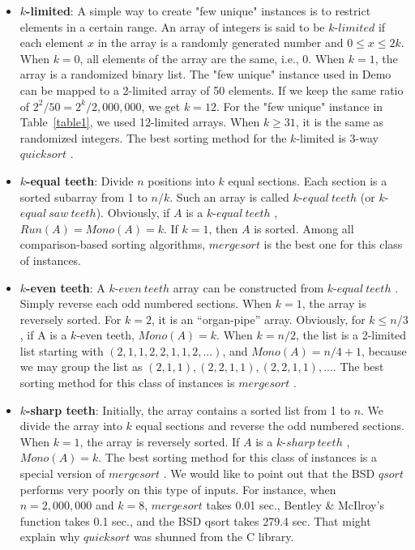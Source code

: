 \documentclass[AMA,STIX1COL]{WileyNJD-v2}
\newcommand{\klit}{$k$-$limited$ }
\newcommand{\keq}{$k$-$equal\ teeth$ }
\newcommand{\kev}{$k$-$even\ teeth$ }
\newcommand{\ksha}{$k$-$sharp\ teeth$ }
\newcommand{\qusort}{$quicksort$ }
\newcommand{\msort}{$mergesort$ }
\begin{document}
\begin{itemize}
\item \textbf{$k$-limited}: A simple way to create "few unique" instances is to restrict elements in a certain range. 
An array of integers is said to be \klit if each element $x$ in the array is a randomly generated number and $0 \leq x \leq 2k$. 
When $k = 0$, all elements of the array are the same, i.e., 0. 
When $k = 1$, the array is a randomized binary list. 
The "few unique" instance used in Demo can be mapped to a 2-limited array of 50 elements.  
If we keep the same ratio of $2^2/50 = 2^k/2,000,000$, we get $k = 12$.  
For the "few unique" instance in Table~\ref{table1}, we used 12-limited arrays.  
When $k \ge 31$, it is the same as randomized integers. 
The best sorting method for the $k$-limited is 3-way \qusort.   

\item \textbf{$k$-equal teeth}: Divide $n$ positions into $k$ equal sections. 
Each section is a sorted subarray from 1 to $n/k$. 
Such an array is called \keq (or $k$-$equal\ saw\ teeth$). 
Obviously, if $A$ is a \keq, $Run(A) = Mono(A) = k$. If $k = 1$, then $A$ is sorted. 
Among all comparison-based sorting algorithms, \msort is the best one for this class of instances. 

\item \textbf{$k$-even teeth}:  A \kev array can be constructed from \keq. 
Simply reverse each odd numbered sections. 
When $k = 1$, the array is reversely sorted. 
For $k = 2$, it is an ``organ-pipe” array.  
Obviously, for $k \leq n/3$, if A is a $k$-even teeth, $Mono(A) = k$. 
When $k = n/2$, the list is a 2-limited list starting with $(2,1,1,2,2,1,1,2, ...)$, and $Mono(A) =  n/4+1$, because we may group the list  as $(2,1,1), (2,2,1,1), (2,2,1,1), ...$. 
The best sorting method for this class of instances is \msort.

\item \textbf{$k$-sharp teeth}:
Initially, the array contains a sorted list from 1 to $n$. 
We divide the array into $k$ equal sections and reverse the odd numbered sections.  
When $k =1$, the array is reversely sorted. 
If $A$ is a \ksha, $Mono(A) = k$.  
The best sorting method for this class of instances is a special version of \msort. 
We would like to point out that the BSD $qsort$ performs very poorly on this type of inputs. 
For instance, when $n = 2,000,000$ and $k = 8$, \msort takes 0.01 sec., Bentley \& McIlroy's function takes 0.1 sec., and the BSD qsort takes 279.4 sec. 
That might explain why \qusort was shunned from the C library.


\end{itemize}
\end{document}
